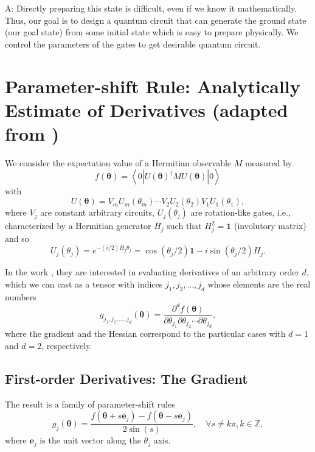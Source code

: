 \documentclass[
        11pt, %
	a4paper, %
]{LegrandOrangeBook}
\begin{document}
A: Directly preparing this state is difficult, even if we know it mathematically. Thus, our goal is to design a quantum circuit that can generate the ground state (our goal state) from some initial state which is easy to prepare physically. We control the parameters of the gates to get desirable quantum circuit. %

\section{Parameter-shift Rule: Analytically Estimate of Derivatives (adapted from \cite{crooks2019gradients})}


We consider the expectation value of a Hermitian observable $M$ measured by
\begin{equation}
    f(\boldsymbol{\theta})=\left\langle 0\left|U(\boldsymbol{\theta})^{\dagger} M U(\boldsymbol{\theta})\right| 0\right\rangle
\end{equation}
with
\begin{equation}
    U(\boldsymbol{\theta})=V_m U_m\left(\theta_m\right) \cdots V_2 U_2(\theta_2) V_1 U_1\left(\theta_1\right),
\end{equation}
where $V_j$ are constant arbitrary circuits, $U_j\left(\theta_j\right)$ are rotation-like gates, i.e., characterized by a Hermitian generator $H_j$ such that $H_j^2=\textbf{1}$ (involutory matrix) and so
\begin{equation}
    U_j\left(\theta_j\right)=e^{-(i / 2) H_j \theta_j}=\cos \left(\theta_j / 2\right) \textbf{1}-i \sin \left(\theta_j / 2\right) H_j .
\end{equation}

In the work \cite{crooks2019gradients}, they are interested in evaluating derivatives of an arbitrary order $d$, which we can cast as a tensor with indices $j_1, j_2, \ldots, j_d$ whose elements are the real numbers
\begin{equation}
    g_{j_1, j_2, \ldots, j_d}(\boldsymbol{\theta})=\frac{\partial^d f(\boldsymbol{\theta})}{\partial \theta_{j_1} \partial \theta_{j_2} \cdots \partial \theta_{j_d}},
\end{equation}
where the gradient and the Hessian correspond to the particular cases with $d=1$ and $d=2$, respectively.

\subsection{First-order Derivatives: The Gradient}
The result is a family of parameter-shift rules
\begin{equation}
    \label{eq:grad-shift}
g_j(\boldsymbol{\theta})=\frac{f\left(\boldsymbol{\theta}+s \mathbf{e}_j\right)-f\left(\boldsymbol{\theta}-s \mathbf{e}_j\right)}{2 \sin (s)}, \quad \forall s \neq k \pi, k \in \mathbb{Z},
\end{equation}
where $\mathbf{e}_j$ is the unit vector along the $\theta_j$ axis. 
\end{document}
